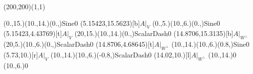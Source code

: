 \unitlength=1bp%

\begin{feynartspicture}(200,200)(1,1)

\FADiagram{}
\FAProp(0.,15.)(10.,14.)(0.,){Sine}{0}
\FALabel(5.15423,15.5623)[b]{$A|_V$}
\FAProp(0.,5.)(10.,6.)(0.,){Sine}{0}
\FALabel(5.15423,4.43769)[t]{$A|_V$}
\FAProp(20,15.)(10.,14.)(0.,){ScalarDash}{0}
\FALabel(14.8706,15.3135)[b]{$A|_{W^\perp}$}
\FAProp(20,5.)(10.,6.)(0.,){ScalarDash}{0}
\FALabel(14.8706,4.68645)[t]{$A|_{W^\perp}$}
\FAProp(10.,14.)(10.,6.)(0.8,){Sine}{0}
\FALabel(5.73,10.)[r]{$A|_V$}
\FAProp(10.,14.)(10.,6.)(-0.8,){ScalarDash}{0}
\FALabel(14.02,10.)[l]{$A|_{W^\perp}$}
\FAVert(10.,14.){0}
\FAVert(10.,6.){0}
\end{feynartspicture}

